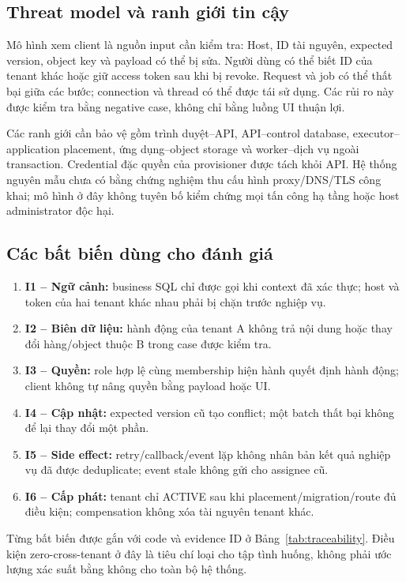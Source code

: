 \subsection{Threat model và ranh giới tin cậy}
Mô hình xem client là nguồn input cần kiểm tra: Host, ID tài nguyên, expected version, object key và payload có thể bị sửa. Người dùng có thể biết ID của tenant khác hoặc giữ access token sau khi bị revoke. Request và job có thể thất bại giữa các bước; connection và thread có thể được tái sử dụng. Các rủi ro này được kiểm tra bằng negative case, không chỉ bằng luồng UI thuận lợi.

Các ranh giới cần bảo vệ gồm trình duyệt--API, API--control database, executor--application placement, ứng dụng--object storage và worker--dịch vụ ngoài transaction. Credential đặc quyền của provisioner được tách khỏi API. Hệ thống nguyên mẫu chưa có bằng chứng nghiệm thu cấu hình proxy\slash DNS\slash TLS công khai; mô hình ở đây không tuyên bố kiểm chứng mọi tấn công hạ tầng hoặc host administrator độc hại.

\subsection{Các bất biến dùng cho đánh giá}
\begin{enumerate}
  \item \textbf{I1 -- Ngữ cảnh:} business SQL chỉ được gọi khi context đã xác thực; host và token của hai tenant khác nhau phải bị chặn trước nghiệp vụ.
  \item \textbf{I2 -- Biên dữ liệu:} hành động của tenant A không trả nội dung hoặc thay đổi hàng\slash object thuộc B trong case được kiểm tra.
  \item \textbf{I3 -- Quyền:} role hợp lệ cùng membership hiện hành quyết định hành động; client không tự nâng quyền bằng payload hoặc UI.
  \item \textbf{I4 -- Cập nhật:} expected version cũ tạo conflict; một batch thất bại không để lại thay đổi một phần.
  \item \textbf{I5 -- Side effect:} retry\slash callback\slash event lặp không nhân bản kết quả nghiệp vụ đã được deduplicate; event stale không gửi cho assignee cũ.
  \item \textbf{I6 -- Cấp phát:} tenant chỉ ACTIVE sau khi placement\slash migration\slash route đủ điều kiện; compensation không xóa tài nguyên tenant khác.
\end{enumerate}
Từng bất biến được gắn với code và evidence ID ở Bảng~\ref{tab:traceability}. Điều kiện zero-cross-tenant ở đây là tiêu chí loại cho tập tình huống, không phải ước lượng xác suất bằng không cho toàn bộ hệ thống.

